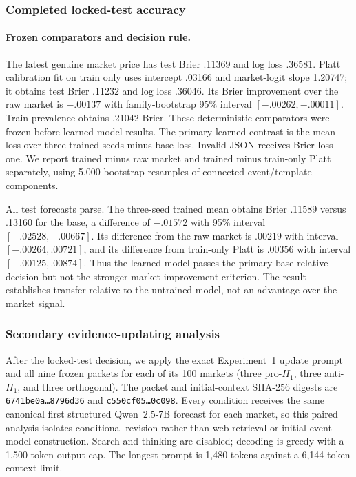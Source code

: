 \subsubsection{Completed locked-test accuracy}
\label{app:exp3b-results}
\paragraph{Frozen comparators and decision rule.}
The latest genuine market price has test Brier .11369 and log loss .36581. Platt
calibration fit on train only uses intercept .03166 and market-logit slope 1.20747;
it obtains test Brier .11232 and log loss .36046. Its Brier improvement over the
raw market is $-.00137$ with family-bootstrap 95\% interval
$[-.00262,-.00011]$. Train prevalence obtains .21042 Brier. These deterministic
comparators were frozen before learned-model results. The primary learned
contrast is the mean loss over three trained seeds minus base loss. Invalid JSON
receives Brier loss one. We report trained minus raw market and trained minus
train-only Platt separately, using 5,000 bootstrap resamples of connected
event/template components.

All test forecasts parse. The three-seed trained mean obtains Brier .11589 versus
.13160 for the base, a
difference of $-.01572$ with 95\% interval $[-.02528,-.00667]$. Its difference
from the raw market is $.00219$ with interval $[-.00264,.00721]$, and its
difference from train-only Platt is $.00356$ with interval
$[-.00125,.00874]$. Thus the learned model passes the primary base-relative
decision but not the stronger market-improvement criterion.
The result establishes transfer relative to the untrained model, not an advantage
over the market signal.

\begin{center}
\begin{minipage}{.9\linewidth}
\centering
{}
\label{tab:exp3b-seed-results}
\scriptsize
\setlength{\tabcolsep}{3.5pt}
\resizebox{\linewidth}{!}{%

}
\end{minipage}
\end{center}

\subsubsection{Secondary evidence-updating analysis}
\label{app:exp3b-update}
After the locked-test decision, we apply the exact Experiment~1 update prompt and
all nine frozen packets for each of its 100 markets (three pro-$H_1$, three
anti-$H_1$, and three orthogonal). The packet and initial-context SHA-256 digests
are \texttt{6741be0a\ldots8796d36} and
\texttt{c550cf05\ldots0c098}. Every condition receives the same canonical first
structured Qwen~2.5-7B forecast for each market, so this paired analysis isolates
conditional revision rather than web retrieval or initial event-model
construction. Search and thinking are disabled; decoding is greedy with a
1,500-token output cap. The longest prompt is 1,480 tokens against a 6,144-token
context limit.

